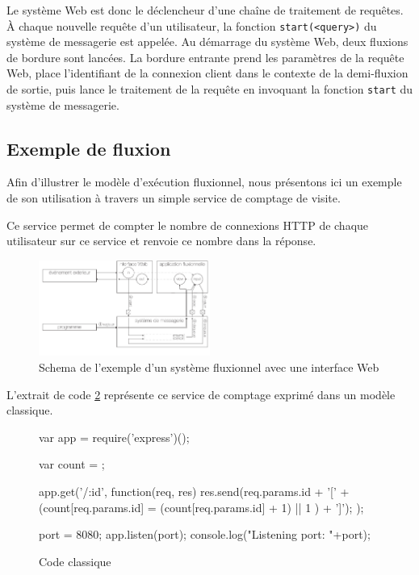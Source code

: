 Le système Web est donc le déclencheur d'une chaîne de traitement de requêtes.
À chaque nouvelle requête d'un utilisateur, la fonction \texttt{start(<query>)} du système de messagerie est appelée.
Au démarrage du système Web, deux fluxions de bordure sont lancées.
La bordure entrante prend les paramètres de la requête Web, place l'identifiant de la connexion client dans le contexte de la demi-fluxion de sortie, puis lance le traitement de la requête en invoquant la fonction \texttt{start} du système de messagerie.

\subsection{Exemple de fluxion}

Afin d'illustrer le modèle d'exécution fluxionnel, nous présentons ici un exemple de son utilisation à travers un simple service de comptage de visite.

Ce service permet de compter le nombre de connexions HTTP de chaque utilisateur sur ce service et renvoie ce nombre dans la réponse.

\begin{figure}[h!]
  \includegraphics[width=0.5\textwidth]{schema-example.pdf}
  \caption{Schema de l'exemple d'un système fluxionnel avec une interface Web}
  \label{fig:example}
\end{figure}

L'extrait de code \ref{lst:classique} représente ce service de comptage exprimé dans un modèle classique.

\begin{figure}
  \begin{code}
  var app = require('express')();

  var count = {};

  app.get('/:id', function(req, res){
    res.send(req.params.id + '[' + (count[req.params.id] = (count[req.params.id] + 1) || 1 ) + ']');
  });

  port = 8080;
  app.listen(port);
  console.log("Listening port: "+port);
  \end{code}
  \caption{Code classique}
  \label{lst:classique}
\end{figure}

